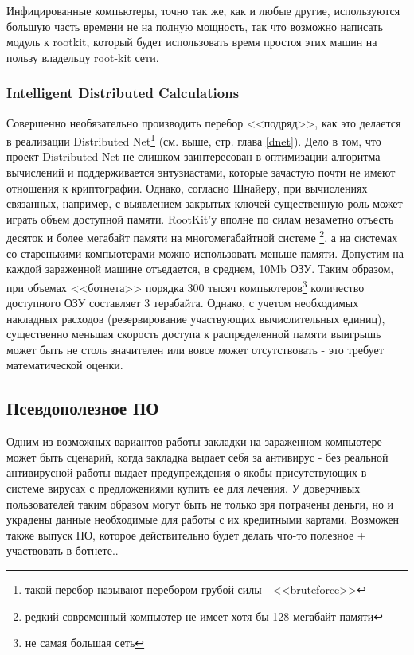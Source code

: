 Инфицированные компьютеры, точно так же, как и любые другие,
используются большую часть времени не на полную мощность, так что
возможно написать модуль к rootkit, который будет использовать время
простоя этих машин на пользу владельцу root-kit сети.

\subsubsection{Intelligent Distributed Calculations}

Совершенно необязательно производить перебор <<подряд>>, как это
делается в реализации Distributed Net\footnote{такой перебор называют перебором грубой силы - <<bruteforce>>} (см. выше, стр. \pageref{dnet}
глава \ref{dnet}). Дело в том, что проект Distributed Net
не слишком заинтересован в оптимизации алгоритма вычислений и
поддерживается энтузиастами, которые зачастую почти не имеют
отношения к криптографии. Однако, согласно Шнайеру, при вычислениях
связанных, например, с выявлением закрытых ключей существенную роль
может играть объем доступной памяти. RootKit'у вполне по силам незаметно
отъесть десяток и более мегабайт памяти на многомегабайтной системе
\footnote{редкий современный компьютер не имеет хотя бы 128 мегабайт памяти},
а на системах со старенькими компьютерами можно использовать меньше памяти.
Допустим на каждой зараженной машине отъедается, в среднем, 10Mb ОЗУ. Таким образом,
при объемах <<ботнета>> порядка 300 тысяч компьютеров\footnote{не самая большая сеть}
количество доступного ОЗУ составляет 3 терабайта. Однако, с учетом необходимых
накладных расходов (резервирование участвующих вычислительных единиц), существенно меньшая
скорость доступа к распределенной памяти выигрышь может быть не столь значителен или вовсе
может отсутствовать - это требует математической оценки.

\subsection{Псевдополезное ПО}
Одним из возможных вариантов работы закладки на зараженном компьютере может быть сценарий, когда закладка выдает себя за антивирус - без реальной антивирусной работы выдает предупреждения о якобы присутствующих в системе вирусах с предложениями купить ее для лечения. У доверчивых пользователей таким образом могут быть не только зря потрачены деньги, но и украдены данные необходимые для работы с их кредитными картами. Возможен также выпуск ПО, которое действительно будет делать что-то полезное + участвовать в ботнете..

